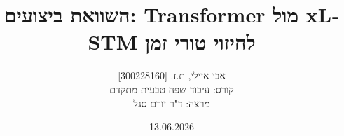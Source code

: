 \title{השוואת ביצועים: \textenglish{Transformer} מול \textenglish{xLSTM} לחיזוי טורי זמן}
\author{אבי איילי, ת.ז. [\textenglish{300228160}] \\ קורס: עיבוד שפה טבעית מתקדם \\ מרצה: ד"ר יורם סגל}
\date{\textenglish{13.06.2026}}
